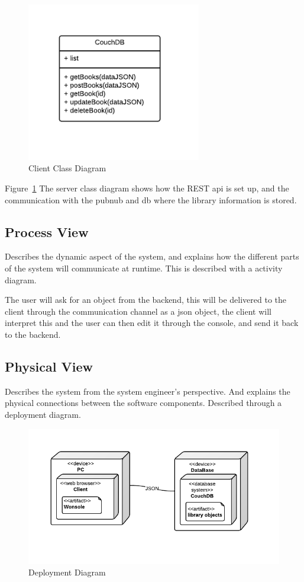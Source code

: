 \begin{figure}[h]
\centering
\includegraphics[width=3in]{image/serverClassDiagram.png}
\caption{Client Class Diagram}
\label{figure:serverClassDiagram}
\end{figure}

Figure~\ref{figure:serverClassDiagram} The server class diagram shows how the REST api is set up, and the communication with the pubnub and db where the library information is stored.


\subsection{Process View}
Describes the dynamic aspect of the system, and explains how the different parts of the system will communicate at runtime. This is described with a activity diagram.

The user will ask for an object from the backend, this will be delivered to the client through the communication channel as a json object, the client will interpret this and the user can then edit it through the console, and send it back to the backend.


\subsection{Physical View}
Describes the system from the system engineer's perspective. And explains the physical connections between the software components. Described through a deployment diagram. 

\begin{figure}[h]
\centering
\includegraphics[width=5in]{image/DeploymentDiagram.png}
\caption{Deployment Diagram}
\label{figure:deploymentDiagram}
\end{figure}

